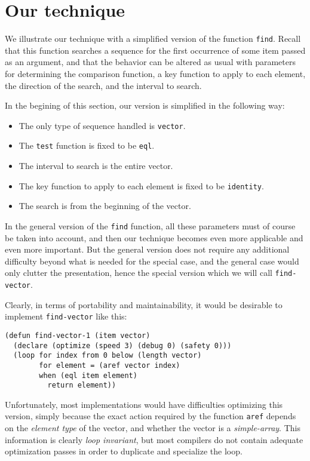 \section{Our technique}

We illustrate our technique with a simplified version of the function
\texttt{find}.  Recall that this function searches a sequence for the
first occurrence of some item passed as an argument, and that the
behavior can be altered as usual with parameters for determining the
comparison function, a key function to apply to each element, the
direction of the search, and the interval to search.

In the begining of this section, our version is simplified in the following way:

\begin{itemize}
\item The only type of sequence handled is \texttt{vector}.
\item The \texttt{test} function is fixed to be \texttt{eql}.
\item The interval to search is the entire vector.
\item The key function to apply to each element is fixed to be
  \texttt{identity}.
\item The search is from the beginning of the vector.
\end{itemize}

In the general version of the \texttt{find} function, all these
parameters must of course be taken into account, and then our
technique becomes even more applicable and even more important.  But
the general version does not require any additional difficulty beyond
what is needed for the special case, and the general case would only
clutter the presentation, hence the special version which we will call
\texttt{find-vector}.

Clearly, in terms of portability and maintainability, it would be
desirable to implement \texttt{find-vector} like this:

{\small\begin{verbatim}
(defun find-vector-1 (item vector)
  (declare (optimize (speed 3) (debug 0) (safety 0)))
  (loop for index from 0 below (length vector)
        for element = (aref vector index)
        when (eql item element)
          return element))
\end{verbatim}}

Unfortunately, most implementations would have difficulties optimizing
this version, simply because the exact action required by the function
\texttt{aref} depends on the \emph{element type} of the vector, and
whether the vector is a \emph{simple-array}.  This information is
clearly \emph{loop invariant}, but most compilers do not contain
adequate optimization passes in order to duplicate and specialize the
loop.

